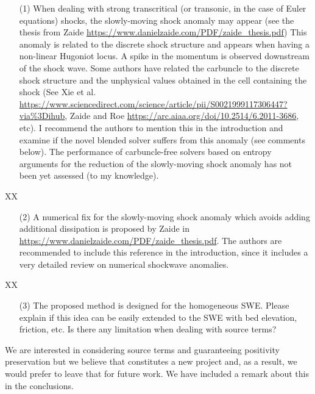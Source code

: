 \documentclass[english,11pt]{article}
\begin{document}
\bigskip
{\color{OliveGreen}
  \begin{itemize}
  \item[(1)]
    When dealing with strong transcritical (or transonic, in the case of Euler equations) shocks, 
    the slowly-moving shock anomaly may appear 
    (see the thesis from Zaide \url{https://www.danielzaide.com/PDF/zaide_thesis.pdf})
    This anomaly is related to the discrete shock structure and appears when having a non-linear Hugoniot locus. 
    A spike in the momentum is observed downstream of the shock wave. Some authors have related the carbuncle to 
    the discrete shock structure and the unphysical values obtained in the cell containing the shock 
    (See Xie et al. \url{https://www.sciencedirect.com/science/article/pii/S0021999117306447?via\%3Dihub},
    Zaide and Roe \url{https://arc.aiaa.org/doi/10.2514/6.2011-3686}, etc). I recommend the authors to mention 
    this in the introduction and examine if the novel blended solver suffers from this anomaly (see comments below). 
    The performance of carbuncle-free solvers based on entropy arguments for the reduction of the slowly-moving 
    shock anomaly has not been yet assessed (to my knowledge).
  \end{itemize}
}
\noindent
XX

\bigskip
{\color{OliveGreen}
  \begin{itemize}
  \item[(2)]
    A numerical fix for the slowly-moving shock anomaly which avoids adding additional dissipation is proposed 
    by Zaide in \url{https://www.danielzaide.com/PDF/zaide_thesis.pdf}.
    The authors are recommended to include this reference in the introduction, 
    since it includes a very detailed review on numerical shockwave anomalies.
  \end{itemize}
}
\noindent
XX

\bigskip
{\color{OliveGreen}
  \begin{itemize}
  \item[(3)]
    The proposed method is designed for the homogeneous SWE. 
    Please explain if this idea can be easily extended to the SWE with bed elevation, friction, etc. 
    Is there any limitation when dealing with source terms?
  \end{itemize}
}
\noindent
We are interested in considering source terms and guaranteeing positivity preservation but 
we believe that constitutes a new project and, as a result, we would prefer to leave that 
for future work. We have included a remark about this in the conclusions. 
      
\end{document}
